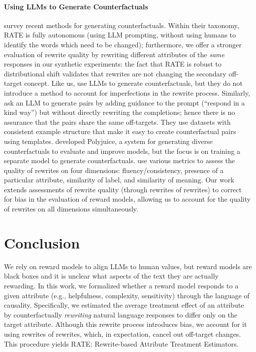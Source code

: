\documentclass{article}
\begin{document}
\paragraph{Using LLMs to Generate Counterfactuals} \citet{wang2024surveynaturallanguagecounterfactual} survey recent methods for generating counterfactuals. 
Within their taxonomy, RATE is fully autonomous (using LLM prompting, without using humans to identify the words which need to be changed); furthermore, we offer a stronger evaluation of rewrite quality by rewriting different attributes of the \emph{same} responses in our synthetic experiments: the fact that RATE is robust to distributional shift validates that rewrites are not changing the secondary off-target concept. 
Like us, \cite{gat2023faithfulexplanationsblackboxnlp} use LLMs to generate counterfactuals, but they do not introduce a method to account for imperfections in the rewrite process. 
Similarly, \citet{butcher2024aligninglargelanguagemodels} ask an LLM to generate pairs by adding guidance to the prompt (``respond in a kind way'') but without directly rewriting the completions; hence there is no assurance that the pairs share the same off-targets. 
They use datasets with consistent example structure that make it easy to create counterfactual pairs using templates. 
\citet{wu2021polyjuicegeneratingcounterfactualsexplaining} developed Polyjuice, a system for generating diverse counterfactuals to evaluate and improve models, but the focus is on training a separate model to generate counterfactuals. 
\citet{fryer2022flexibletextgenerationcounterfactual} use various metrics to assess the quality of rewrites on four dimensions: fluency/consistency, presence of a particular attribute, similarity of label, and similarity of meaning. Our work extends assessments of rewrite quality (through rewrites of rewrites) to correct for bias in the evaluation of reward models, allowing us to account for the quality of rewrites on all dimensions simultaneously.

\section{Conclusion}
We rely on reward models to align LLMs to human values, but reward models are black boxes and it is unclear what aspects of the text they are actually rewarding. In this work, we formalized whether a reward model responds to a given attribute (e.g., helpfulness, complexity, sensitivity) through the language of causality. Specifically, we estimated the average treatment effect of an attribute by counterfactually \emph{rewriting} natural language responses to differ only on the target attribute. Although this rewrite process introduces bias, we account for it using rewrites of rewrites, which, in expectation, cancel out off-target changes. This procedure yields RATE: Rewrite-based Attribute Treatment Estimators. 
\end{document}
